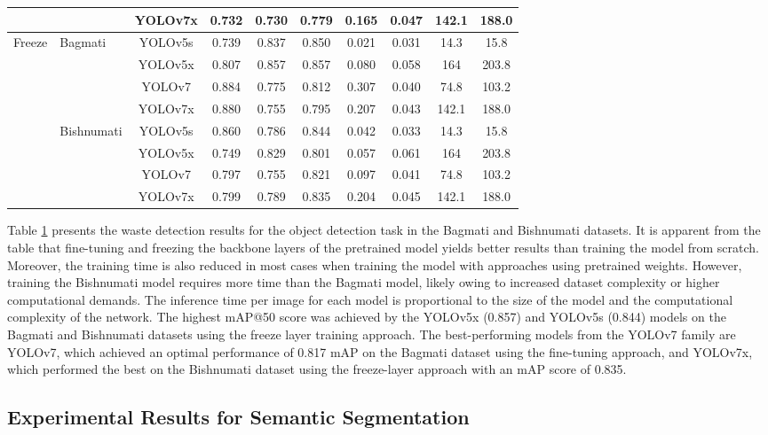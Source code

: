 \documentclass{ieeeaccess}
\begin{document}
\begin{table}[]
\begin{tabular}{llcccccccc}
& & YOLOv7x &  0.732&  0.730& 0.779 & 0.165 &  0.047 &142.1 & 188.0\\  
\hline
\multirow{8}{*}{Freeze} & \multirow{4}{*}{Bagmati}  
& YOLOv5s & 0.739 & 0.837 &0.850  & 0.021 &  0.031 & 14.3 &15.8 \\  
& & YOLOv5x & 0.807 & 0.857 & 0.857 & 0.080 &  0.058 & 164 & 203.8\\  
& & YOLOv7 & 0.884 & 0.775 & 0.812 & 0.307 &  0.040 & 74.8 & 103.2\\  
& & YOLOv7x &  0.880& 0.755 &0.795  & 0.207 &  0.043 &142.1 & 188.0\\  
\cline{2-10}
& \multirow{4}{*}{Bishnumati}  
& YOLOv5s & 0.860 & 0.786 & 0.844 & 0.042 &  0.033 & 14.3 &15.8 \\  
& & YOLOv5x & 0.749 & 0.829 & 0.801 & 0.057 &  0.061 & 164 & 203.8\\  
& & YOLOv7 & 0.797 & 0.755 & 0.821 & 0.097 & 0.041 & 74.8 & 103.2\\  
& & YOLOv7x & 0.799 &  0.789&  0.835&  0.204&  0.045 &142.1 & 188.0\\  
\hline
\end{tabular}
\label{table:OD}
\end{table}

Table \ref{table:OD} presents the waste detection results for the object detection task in the Bagmati and Bishnumati datasets. It is apparent from the table that fine-tuning and freezing the backbone layers of the pretrained model yields better results than training the model from scratch. Moreover, the training time is also reduced in most cases when training the model with approaches using pretrained weights. However, training the Bishnumati model requires more time than the Bagmati model, likely owing to increased dataset complexity or higher computational demands. The inference time per image for each model is proportional to the size of the model and the computational complexity of the network. The highest mAP@50 score was achieved by the YOLOv5x (0.857) and YOLOv5s (0.844) models on the Bagmati and Bishnumati datasets using the freeze layer training approach. The best-performing models from the YOLOv7 family are YOLOv7, which achieved an optimal performance of 0.817 mAP on the Bagmati dataset using the fine-tuning approach, and YOLOv7x, which performed the best on the Bishnumati dataset using the freeze-layer approach with an mAP score of 0.835.

\subsection{Experimental Results for Semantic Segmentation}
\end{document}
